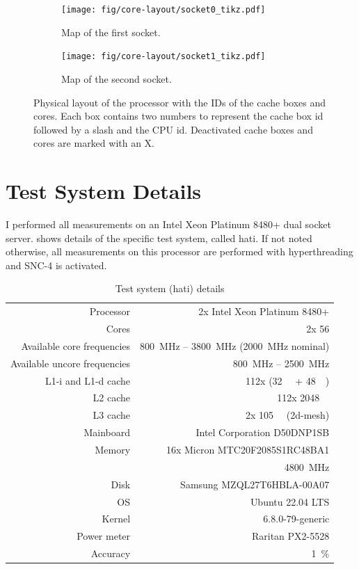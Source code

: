 \begin{figure}[]
    \begin{subfigure}[t]{0.45\linewidth}
        \centering
        \texttt{[image: fig/core-layout/socket0\_tikz.pdf]}
        \caption{Map of the first socket.}
    \end{subfigure}
    \hfill
    \begin{subfigure}[t]{0.45\linewidth}
        \centering
        \texttt{[image: fig/core-layout/socket1\_tikz.pdf]}
        \caption{Map of the second socket.}
    \end{subfigure}
    \caption{\label{fig:physical-layout}Physical layout of the processor with the IDs of the cache boxes and cores.
	Each box contains two numbers to represent the cache box id followed by a slash and the CPU id.
	Deactivated cache boxes and cores are marked with an X.}
\end{figure}

\section{Test System Details}
I performed all measurements on an Intel Xeon Platinum 8480+ dual socket server.
 shows details of the specific test system, called hati.
If not noted otherwise, all measurements on this processor are performed with hyperthreading and SNC-4 is activated.

\begin{table}[t]
	\centering
	\caption{\label{tab:test-system}Test system (hati) details}
	\begin{tabular}{rr}
		\toprule
		Processor	&	2x Intel Xeon Platinum 8480+ \\
		\rowcolor[HTML]{EFEFEF}Cores		&	2x 56 \\
		Available core frequencies	&	\SI{800}{\MHz} -- \SI{3800}{\MHz} (\SI{2000}{\MHz} nominal) \\
		\rowcolor[HTML]{EFEFEF}Available uncore frequencies	&	\SI{800}{\MHz} -- \SI{2500}{\MHz} \\
		L1-i and L1-d cache	&	112x (\SI{32}{\kibi\byte} + \SI{48}{\kibi\byte})\\
		\rowcolor[HTML]{EFEFEF}L2 cache	&	112x \SI{2048}{\kibi\byte} \\
		L3 cache	&	2x \SI{105}{\mebi\byte} (2d-mesh) \\
		\rowcolor[HTML]{EFEFEF}Mainboard	&	Intel Corporation D50DNP1SB \\
		Memory		&	16x Micron MTC20F2085S1RC48BA1  \\
		 &	\SI{4800}{\mega\hertz} \\
		\rowcolor[HTML]{EFEFEF}Disk		&	Samsung MZQL27T6HBLA-00A07 \\
		OS           &   Ubuntu 22.04 LTS \\
		\rowcolor[HTML]{EFEFEF} Kernel          &   6.8.0-79-generic \\
		Power meter & Raritan PX2-5528\\
		\rowcolor[HTML]{EFEFEF} Accuracy & \SI{1}{\percent}\\
		\bottomrule
	\end{tabular}
\end{table}

